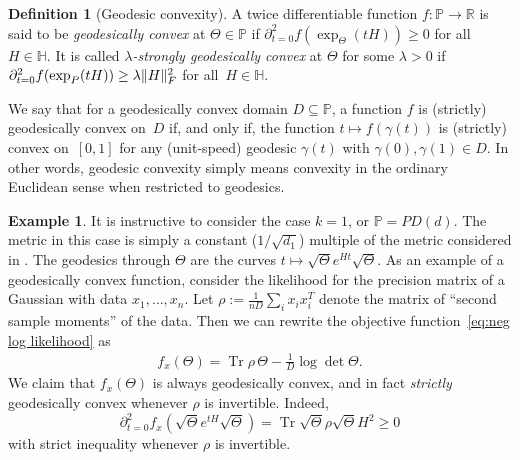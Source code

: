 \documentclass[aos]{imsart}
\theoremstyle{definition}
\newtheorem{definition}[theorem]{Definition}
\newtheorem{example}[theorem]{Example}
\numberwithin{equation}{section}
\DeclareMathOperator{\tr}{Tr}
\DeclarePairedDelimiter{\norm}{\lVert}{\rVert}
\newcommand{\R}{{\mathbb{R}}}
\renewcommand{\P}{{\mathbb{P}}}
\renewcommand{\H}{{\mathbb{H}}}
\begin{document}
\begin{definition}[Geodesic convexity]
A twice differentiable function $f\colon \P \to \R$ is said to be \emph{geodesically convex} at $\Theta\in\P$ if $\partial^2_{t=0} f(\exp_\Theta(tH)) \geq 0$ for all~$H\in\H$.
It is called \emph{$\lambda$-strongly geodesically convex} at $\Theta$ for some $\lambda>0$ if $\partial^2_{t=0} f(\exp_P(tH)) \geq \lambda \norm H_F^2$ for all~$H\in\H$.


We say that for a geodesically convex domain $D \subseteq \P$, a function $f$ is (strictly) geodesically convex on~$D$ if, and only if, the function $t \mapsto f(\gamma(t))$ is (strictly) convex on~$[0,1]$ for any (unit-speed) geodesic $\gamma(t)$ with $\gamma(0),\gamma(1)\in D$.
In other words, geodesic convexity simply means convexity in the ordinary Euclidean sense when restricted to geodesics.

\begin{example}\label{exa:usual-likelihood} It is instructive to consider the case $k = 1$, or $\P = PD(d)$. The metric in this case is simply a constant ($1/\sqrt{d_1}$) multiple of the metric considered in \citep{bhatia2009positive,skovgaard1984riemannian}. The geodesics through $\Theta$ are the curves $t \mapsto \sqrt{\Theta} e^{H t} \sqrt{\Theta}.$ As an example of a geodesically convex function, consider the likelihood for the precision matrix of a Gaussian with data $x_1, \dots, x_n$. Let $\rho := \frac1{nD}\sum_i x_i x_i^T$ denote the matrix of ``second sample moments'' of the data. Then we can rewrite the objective function~\eqref{eq:neg log likelihood} as
\begin{align*}%
  f_x(\Theta) = \tr \rho \, \Theta - \frac1D \log \det \Theta.
\end{align*}
We claim that $f_x(\Theta)$ is always geodesically convex, and in fact \emph{strictly} geodesically convex whenever $\rho$ is invertible. Indeed,
$$ \partial^2_{t = 0} f_x(\sqrt{\Theta} e^{t H} \sqrt{\Theta}) = \tr \sqrt{\Theta} \rho \sqrt{\Theta} H^2 \geq 0 $$
with strict inequality whenever $\rho$ is invertible.

\end{example}


\end{definition}
\end{document}
